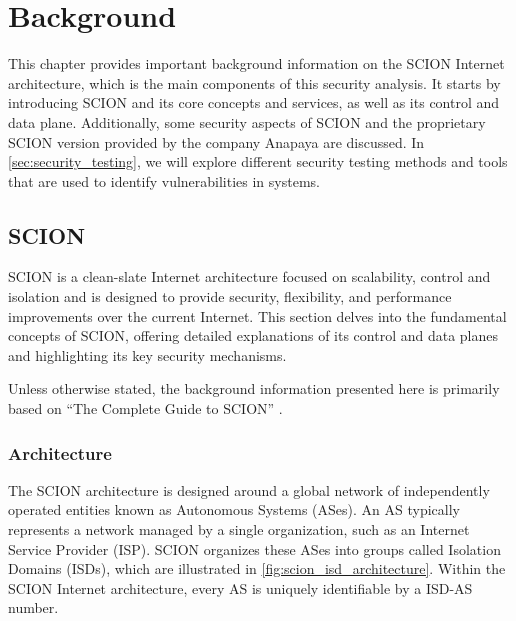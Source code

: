\chapter{Background}
\label{ch:background}



This chapter provides important background information on the SCION Internet architecture, which is the main components of this security analysis.
It starts by introducing SCION and its core concepts and services, as well as its control and data plane.
Additionally, some security aspects of SCION and the proprietary SCION version provided by the company Anapaya are discussed.
In \cref{sec:security_testing}, we will explore different security testing methods and tools that are used to identify vulnerabilities in systems.


\section{SCION}

SCION \cite{Perrig2022} is a clean-slate Internet architecture focused on scalability, control and isolation and is designed to provide security, flexibility, and performance improvements over the current Internet.
This section delves into the fundamental concepts of SCION, offering detailed explanations of its control and data planes and highlighting its key security mechanisms.

Unless otherwise stated, the background information presented here is primarily based on  ``The Complete Guide to SCION'' \cite{Perrig2022}.

\subsection{Architecture}

The SCION architecture is designed around a global network of independently operated entities known as Autonomous Systems (ASes).
An AS typically represents a network managed by a single organization, such as an Internet Service Provider (ISP).
SCION organizes these ASes into groups called Isolation Domains (ISDs), which are illustrated in \cref{fig:scion_isd_architecture}.
Within the SCION Internet architecture, every AS is uniquely identifiable by a ISD-AS number.

